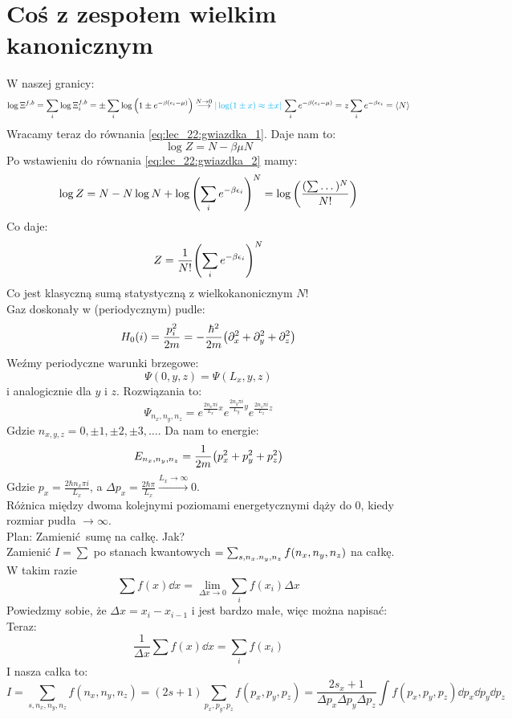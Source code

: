 \documentclass[12pt,a4paper]{report}
\newcommand{\pd}[1]{\partial_{#1}}
\newenvironment{lecture}[1]{\par\medskip
   \noindent\chapter{#1} \rmfamily}{\medskip}
\begin{document}
\begin{lecture}{Coś z zespołem wielkim kanonicznym}
    W naszej granicy:
    \[
        \log \Xi^{f, b} = \sum_i \log \Xi_i^{f, b} = \pm \sum_i \log\qty(1 \pm e^{-\beta \qty(\epsilon_i - \mu)}) \stackrel{N \to 0}{\longrightarrow }  {\color{cyan}| \log(1\pm x) \approx \pm x|} \, \sum_i e^{-\beta(\epsilon_i - \mu)} = z \sum_i e^{-\beta \epsilon_i} = \ev{N}
    \]
    Wracamy teraz do równania \eqref{eq:lec_22:gwiazdka_1}. Daje nam to:
    \begin{equation}\label{eq:lec_22:gwiazdka_2}
        \log Z = N - \beta \mu N
    \end{equation}
    Po wstawieniu do równania \eqref{eq:lec_22:gwiazdka_2} mamy:
    \[
        \log Z = N - N \log N + \log \qty(\sum_i e^{-\beta \epsilon_i})^N = \log\qty(\frac{(\sum \dots)^N}{N!})  
    \]
    Co daje:
    \[
        Z = \frac{1}{N!} \qty(\sum_i e^{-\beta \epsilon_i})^N
    \]
    Co jest klasyczną sumą statystyczną z wielkokanonicznym $N!$\\
    Gaz doskonały w (periodycznym) pudle:
    \[
        H_0(i) = \frac{p_i^2}{2m} = -\frac{\hbar^2}{2m} \qty(\pd{x}^2 + \pd{y}^2 + \pd{z}^2)    
    \]
    Weźmy periodyczne warunki brzegowe:
    \[
        \Psi(0, y, z) = \Psi(L_x, y, z)    
    \]
    i analogicznie dla $y$ i $z$. Rozwiązania to:
    \[
        \Psi_{n_x, n_y, n_z} = e^{\frac{2 n_x \pi i}{L_x} x} e^{\frac{2 n_y \pi i}{L_y} y}e^{\frac{2 n_z \pi i}{L_z} z}   
    \]
    Gdzie $n_{x,y,z} = 0, \pm 1, \pm 2, \pm 3, \dots$. Da nam to energie:
    \[
        E_{n_x, n_y, n_z} = \frac{1}{2m} \qty(p_x^2 + p_y^2 + p_z^2)    
    \]
    Gdzie $p_x = \frac{2 \hbar n_x \pi i}{L_x}$, a $\Delta p_x = \frac{2 \hbar \pi}{L_x} \stackrel{L_x \to \infty}{\longrightarrow} 0$.\\
    Różnica między dwoma kolejnymi poziomami energetycznymi dąży do $0$, kiedy rozmiar pudła $\to \infty$.\\
    Plan: Zamienić sumę na całkę. Jak?\\
    Zamienić $I = \sum$ po stanach kwantowych $= \sum_{s, n_x. n_y, n_z} f\qty(n_x, n_y, n_z)$ na całkę.\\
    W takim razie 
    \[
        \sum f(x) \dd{x} = \lim_{\Delta x \to 0} \sum_i f(x_i) \Delta x
    \]
    Powiedzmy sobie, że $\Delta x = x_i - x_{i-1}$ i jest bardzo małe, więc można napisać:
    Teraz:
    \[
        \frac{1}{\Delta x} \sum f(x) \dd{x} = \sum_i f(x_i)
    \]
    I nasza całka to:
    \[
        I = \sum_{s, n_x, n_y, n_z} f(n_x, n_y, n_z) = (2s+1) \sum_{p_x, p_y, p_z} f(p_x, p_y, p_z) = \frac{2s_x + 1}{\Delta p_x \Delta p_y \Delta p_z} \int f(p_x, p_y, p_z) \dd{p_x} \dd{p_y} \dd{p_z}
\]
\end{lecture}
\end{document}
